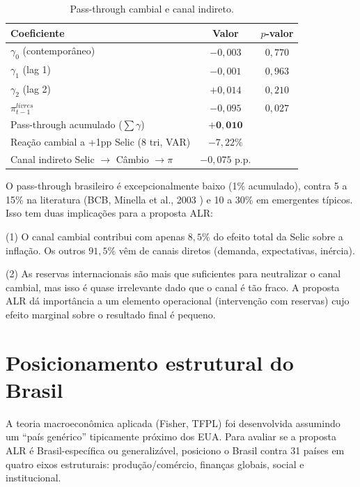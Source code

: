 \documentclass[11pt,a4paper]{article}
\begin{document}
\begin{table}[H]
\centering
\small
\begin{tabular}{lcc}
\toprule
Coeficiente & Valor & $p$-valor \\
\midrule
$\gamma_0$ (contemporâneo) & $-0{,}003$ & $0{,}770$ \\
$\gamma_1$ (lag 1) & $-0{,}001$ & $0{,}963$ \\
$\gamma_2$ (lag 2) & $+0{,}014$ & $0{,}210$ \\
$\pi^{livres}_{t-1}$ & $-0{,}095$ & $0{,}027$ \\
\midrule
Pass-through acumulado ($\sum \gamma$) & $\mathbf{+0{,}010}$ & \\
Reação cambial a +1pp Selic (8 tri, VAR) & $-7{,}22\%$ & \\
Canal indireto Selic $\to$ Câmbio $\to \pi$ & $-0{,}075$ p.p. & \\
\bottomrule
\end{tabular}
\caption{Pass-through cambial e canal indireto.}
\label{tab:cambio}
\end{table}

O pass-through brasileiro é excepcionalmente baixo (1\% acumulado), contra
5 a 15\% na literatura (BCB, Minella et al., 2003 \cite{minella2003}) e
10 a 30\% em emergentes típicos. Isso tem duas implicações para a proposta
ALR:

(1) O canal cambial contribui com apenas $8{,}5\%$ do efeito total da
Selic sobre a inflação. Os outros $91{,}5\%$ vêm de canais diretos
(demanda, expectativas, inércia).

(2) As reservas internacionais são mais que suficientes para neutralizar
o canal cambial, mas isso é quase irrelevante dado que o canal é
tão fraco. A proposta ALR dá importância a um elemento operacional
(intervenção com reservas) cujo efeito marginal sobre o resultado final
é pequeno.

\section{Posicionamento estrutural do Brasil}\label{sec:macro}

A teoria macroeconômica aplicada (Fisher, TFPL) foi desenvolvida assumindo
um ``país genérico'' tipicamente próximo dos EUA. Para avaliar se a
proposta ALR é Brasil-específica ou generalizável, posiciono o Brasil
contra 31 países em quatro eixos estruturais: produção/comércio, finanças
globais, social e institucional.
\end{document}
